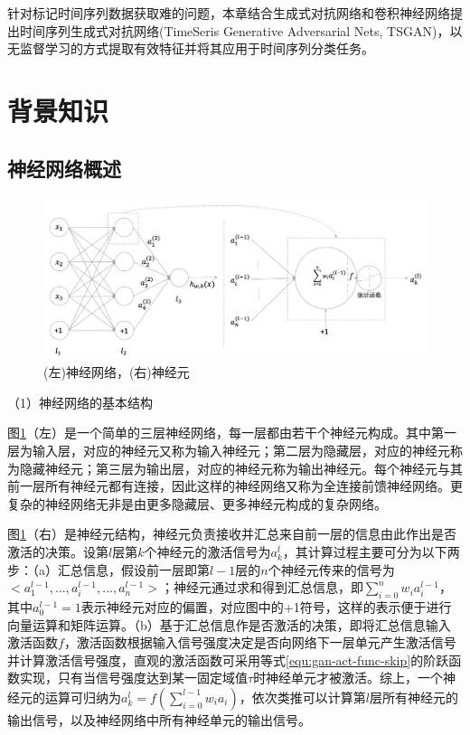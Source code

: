针对标记时间序列数据获取难的问题，本章结合生成式对抗网络和卷积神经网络提出时间序列生成式对抗网络(TimeSeris Generative Adversarial Nets, TSGAN)，以无监督学习的方式提取有效特征并将其应用于时间序列分类任务。

\section{背景知识}
\subsection{神经网络概述}
\label{tsgan-nn}

\begin{figure}[H]
\centering
\includegraphics[scale=0.5]{figures/gan-neural-net.png}
\caption{(左)神经网络，(右)神经元}
\label{fig:gan-nn}
\end{figure}

（1）神经网络的基本结构

图\ref{fig:gan-nn}（左）是一个简单的三层神经网络，每一层都由若干个神经元构成。其中第一层为输入层，对应的神经元又称为输入神经元；第二层为隐藏层，对应的神经元称为隐藏神经元；第三层为输出层，对应的神经元称为输出神经元。每个神经元与其前一层所有神经元都有连接，因此这样的神经网络又称为全连接前馈神经网络。更复杂的神经网络无非是由更多隐藏层、更多神经元构成的复杂网络。

图\ref{fig:gan-nn}（右）是神经元结构，神经元负责接收并汇总来自前一层的信息由此作出是否激活的决策。设第$l$层第$k$个神经元的激活信号为$a_{k}^{l}$，其计算过程主要可分为以下两步：（a）汇总信息，假设前一层即第$l-1$层的$n$个神经元传来的信号为$<a_{1}^{l-1},...,a_{i}^{l-1}, ..., a_{n}^{l-1}>$；神经元通过求和得到汇总信息，即$\sum_{i=0}^{n}w_{i}a_{i}^{l-1}$，其中$a_{0}^{l-1}=1$表示神经元对应的偏置，对应图中的+1符号，这样的表示便于进行向量运算和矩阵运算。（b）基于汇总信息作是否激活的决策，即将汇总信息输入激活函数$f$，激活函数根据输入信号强度决定是否向网络下一层单元产生激活信号并计算激活信号强度，直观的激活函数可采用等式\ref{equ:gan-act-func-skip}的阶跃函数实现，只有当信号强度达到某一固定域值$\tau$时神经单元才被激活。综上，一个神经元的运算可归纳为$a_{k}^{l}=f(\sum_{i=0}^{l-1}w_{i}a_{i})$，依次类推可以计算第$l$层所有神经元的输出信号，以及神经网络中所有神经单元的输出信号。

